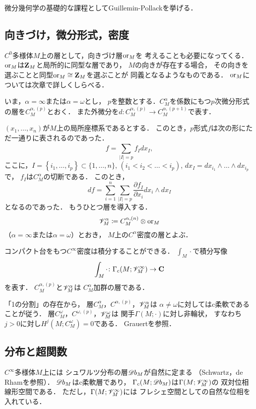 微分幾何学の基礎的な課程としてGuillemin-Pollack\cite{GP74}を挙げる．

\subsection{向きづけ，微分形式，密度}\label{ssec:ori-form-dens}
\(C^0\)多様体\(M\)上の層として，向きづけ層\(\mathord{\mathrm{or}} _M\)を
考えることも必要になってくる．
\(\mathord{\mathrm{or}}_M\)は\(\mathbf{Z}_M\)と局所的に同型な層であり，
\(M\)の向きが存在する場合，
その向きを選ぶことと同型\(\mathord{\mathrm{or}}_M\cong\mathbf{Z}_M\)を選ぶことが
同義となるようなものである．
\(\mathord{\mathrm{or}}_M\)については次章で詳しくしらべる．

いま，\(\alpha=\infty\)または\(\alpha=\omega\)とし，
\(p\)を整数とする．\(C^\alpha_M\)を係数にもつ\(p\)次微分形式
の層を\(C_M^{\alpha,(p)}\)とおく．
また外微分を\(
    d\colon C_M^{\alpha,(p)}\to C_M^{\alpha,(p+1)}
\)で表す．

\((x_1,\dots,x_n)\)が\(M\)上の局所座標系であるとする．
このとき，\(p\)形式\(f\)は次の形にただ一通りに表されるのであった．
\[
    f=\sum_{\lvert I\rvert=p}^{}f_Idx_I,
\]ここに，\(
    I=\left\{i_1,\dots,i_p\right\}\subset\{1,\dots,n\}
\), \((i_1<i_2<\dots<i_p)\), 
\(dx_I=dx_{i_1}\wedge\dots\wedge dx_{i_p}\)で，
\(f_I\)は\(C^\alpha_M\)の切断である．
このとき，\[
    df=\sum_{i=1}^{n}\sum_{\lvert I\rvert=p}^{}\frac{\partial f_I}{\partial x_i}dx_i\wedge dx_I
\]となるのであった．
もうひとつ層を導入する．
\[
    \mathscr{V}_M^\alpha
    \coloneqq
    C^{\alpha,(n)}_M\otimes\mathord{\mathrm{or}}_M
\]（\(\alpha=\infty\)または\(\alpha=\omega\)）とおき，
\(M\)上の\(C^\alpha\)密度の層とよぶ．

コンパクト台をもつ\(C^\infty\)密度は積分することができる．
\(\int_M\cdot\)で積分写像
\begin{equation}
    \int_M\cdot\colon\Gamma_c(M;\mathscr{V}_M^\infty)\to\mathbf{C} \label{eq:int}
\end{equation}を表す．
\(C^{\alpha,(p)}_M\)と\(\mathscr{V}_M^\alpha\)は
\(C^\alpha_M\)加群の層である．

「1の分割」の存在から，
層\(C^\alpha_M\)，\(C^{\alpha,(p)}\)，\(\mathscr{V}_M^\alpha\)は
\(\alpha\neq\omega\)に対してはc柔軟であることが従う．
層\(C^\omega_M\)，\(C^{\omega,(p)}\)，\(\mathscr{V}_M^\omega\)は
関手\(\Gamma(M;\cdot)\)に対し非輪状，
すなわち\(j>0\)に対し\(H^j(M;C^\omega_M)=0\)である．
Grauert\cite{G58}を参照．

\subsection{分布と超関数}\label{ssec:dist-hyper}
\(C^\infty\)多様体\(M\)上には
シュワルツ分布の層\(\mathord{\mathscr{D}b}_M\)が自然に定まる
（Schwartz\cite{S66}，de Rham\cite{R55}を参照）．
\(\mathord{\mathscr{D}b}_M\)はc柔軟層であり，
\(\Gamma_c(M;\mathord{\mathscr{D}b}_M)\)は\(\Gamma(M;\mathscr{V}_M^\infty)\)の
双対位相線形空間である．
ただし，\(\Gamma(M;\mathscr{V}_M^\infty)\)には
フレシェ空間としての自然な位相を入れている．

